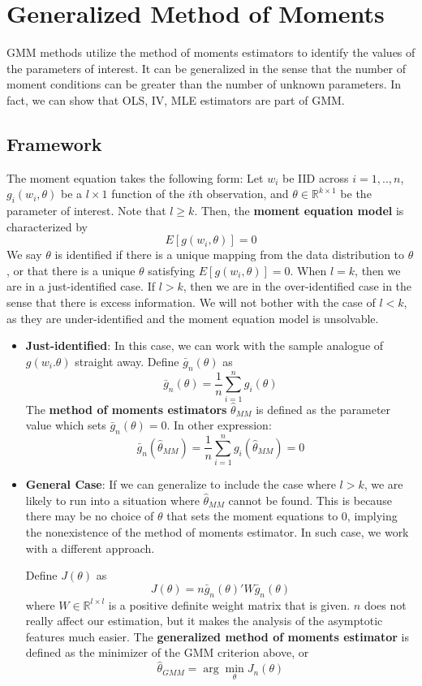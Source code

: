 
\chapter{Generalized Method of Moments}
GMM methods utilize the method of moments estimators to identify the values of the parameters of interest. It can be generalized in the sense that the number of moment conditions can be greater than the number of unknown parameters. In fact, we can show that OLS, IV, MLE estimators are part of GMM. 
\section{Framework}
The moment equation takes the following form: Let $w_i$ be IID across $i=1,..,n$,  $g_i(w_i, \theta)$ be a $l\times1$ function of the $i$th observation, and $\theta\in\mathbb{R}^{k\times1}$ be the parameter of interest.  Note that $l\geq k$. Then, the \textbf{moment equation model} is characterized by
\[
E[g(w_i,\theta)]=0
\]
 We say $\theta$ is identified if there is a unique mapping from the data distribution to $\theta$, or that there is a unique $\theta$ satisfying $E[g(w_i,\theta)]=0$. When $l=k$, then we are in a just-identified case. If $l>k$, then we are in the over-identified case in the sense that there is excess information. We will not bother with the case of $l<k$, as they are under-identified and the moment equation model is unsolvable. \par
\begin{itemize}
\item \textbf{Just-identified}: In this case, we can work with the sample analogue of $g(w_i.\theta)$ straight away. Define $\bar{g}_n(\theta)$ as 
\[
\bar{g}_n(\theta)=\frac{1}{n}\sum_{i=1}^ng_i(\theta)
\]
The \textbf{method of moments estimators} $\hat{\theta}_{MM}$ is defined as the parameter value which sets $\bar{g}_n(\theta)=0$. In other expression:
\[
\bar{g}_n(\hat{\theta}_{MM})=\frac{1}{n}\sum_{i=1}^ng_i(\hat{\theta}_{MM})=0
\] 
\item \textbf{General Case}: If we can generalize to include the case where $l>k$, we are likely to run into a situation where $\hat{\theta}_{MM}$ cannot be found. This is because there may be no choice of $\theta$ that sets the moment equations to 0, implying the nonexistence of the method of moments estimator. In such case, we work with a different approach. 
\par
Define $J(\theta)$ as
\[
J(\theta)=n \bar{g}_n(\theta)'W\bar{g}_n(\theta)
\]
where $W\in\mathbb{R}^{l\times l}$ is a positive definite weight matrix that is given. $n$ does not really affect our estimation, but it makes the analysis of the asymptotic features much easier. The \textbf{generalized method of moments estimator} is defined as the minimizer of the GMM criterion above, or
\[
\hat{\theta}_{GMM}=\arg\min_\theta J_n(\theta)
\]
\end{itemize}\par

